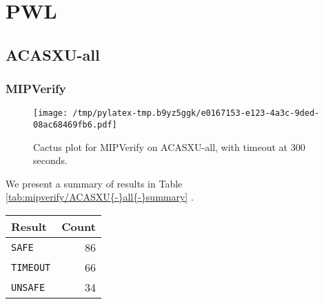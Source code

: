 \documentclass{article}%
\begin{document}
%
\normalsize%
\section{PWL}%
\label{sec:PWL}%
\subsection{ACASXU{-}all}%
\label{subsec:ACASXU{-}all}%
\subsubsection{MIPVerify}%
\label{ssubsec:MIPVerify}%


\begin{figure}[htb]%
\centering%
\texttt{[image: /tmp/pylatex-tmp.b9yz5ggk/e0167153-e123-4a3c-9ded-08ac68469fb6.pdf]}%
\caption{Cactus plot for MIPVerify on ACASXU{-}all, with timeout at 300 seconds.}%
\end{figure}

%
We present a summary of results in Table %
\ref{tab:mipverify/ACASXU{-}all{-}summary}%
.%


\begin{table}[!h]%
\caption{Summary of results for MIPVerify on ACASXU{-}all. Timeouts were set at 300 secs.}%
\label{tab:mipverify/ACASXU{-}all{-}summary}%
\begin{longtable}{@{}l|r@{}}%
\toprule%
\textbf{Result}&\textbf{Count}\\%
\midrule%
\verb|SAFE|&86\\%
\verb|TIMEOUT|&66\\%
\verb|UNSAFE|&34\\\bottomrule%
%
\end{longtable}%
\end{table}
\end{document}
